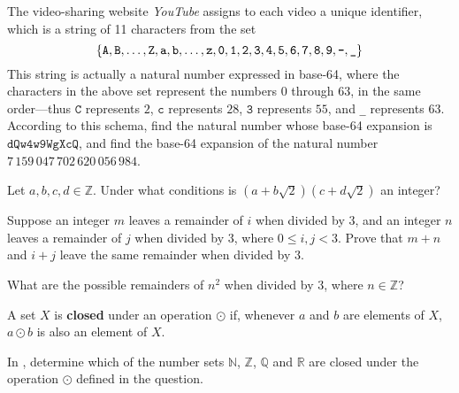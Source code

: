 \begin{chapex}
The video-sharing website \textit{YouTube} assigns to each video a unique identifier, which is a string of 11 characters from the set
\[ \{ \mathtt{A}, \mathtt{B}, \dots, \mathtt{Z}, \mathtt{a}, \mathtt{b}, \dots, \mathtt{z}, \mathtt{0}, \mathtt{1}, \mathtt{2}, \mathtt{3}, \mathtt{4}, \mathtt{5}, \mathtt{6}, \mathtt{7}, \mathtt{8}, \mathtt{9}, \text{\texttt{-}}, \text{\texttt{\_}} \} \]
This string is actually a natural number expressed in base-64, where the characters in the above set represent the numbers $0$ through $63$, in the same order---thus $\mathtt{C}$ represents $2$, $\mathtt{c}$ represents $28$, $\mathtt{3}$ represents $55$, and \texttt{\_} represents $63$. According to this schema, find the natural number whose base-64 expansion is $\mathtt{dQw4w9WgXcQ}$, and find the base-64 expansion of the natural number $7\,159\,047\,702\,620\,056\,984$.
\end{chapex}

\begin{chapex}
Let $a, b, c, d \in \mathbb{Z}$. Under what conditions is $(a+b\sqrt{2})(c+d\sqrt{2})$ an integer?
\end{chapex}

\begin{chapex}
Suppose an integer $m$ leaves a remainder of $i$ when divided by $3$, and an integer $n$ leaves a remainder of $j$ when divided by $3$, where $0 \le i,j < 3$. Prove that $m+n$ and $i+j$ leave the same remainder when divided by $3$.
\end{chapex}

\begin{chapex}
What are the possible remainders of $n^2$ when divided by $3$, where $n \in \mathbb{Z}$?
\end{chapex}

\begin{definition}
A set $X$ is \textbf{closed} under an operation $\odot$ if, whenever $a$ and $b$ are elements of $X$, $a \odot b$ is also an element of $X$.
\end{definition}

In , determine which of the number sets $\mathbb{N}$, $\mathbb{Z}$, $\mathbb{Q}$ and $\mathbb{R}$ are closed under the operation $\odot$ defined in the question.

